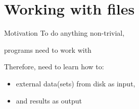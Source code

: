 \documentclass[aspectratio=169,usenames,dvipsnames]{beamer}
\begin{document}



\section{Working with files}
\frame{\tableofcontents[currentsection]}

\begin{frame}{Motivation}
    To do anything non-trivial,

    programs need to work with 

    \pause
    \vspace{1em}
    Therefore, need to learn how to:

	\begin{itemize}
		\item {} external data(sets) from disk as input,
		\item and  results as output
	\end{itemize}

\end{frame}
\end{document}
